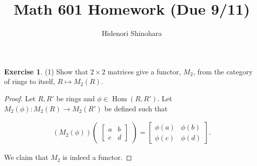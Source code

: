 \documentclass[12pt, psamsfonts]{amsart}
\theoremstyle{definition}
\newtheorem*{exer}{Exercise}
\theoremstyle{remark}
\DeclareMathOperator{\Hom}{Hom}
\numberwithin{equation}{section}
\begin{document}
\title{Math 601 Homework (Due 9/11)}
\author{Hidenori Shinohara}
\maketitle

\begin{exer}{(1)}
  Show that $2 \times 2$ matrices give a functor, $M_2$, from the category of rings to itself, $R \mapsto M_2(R)$.
\end{exer}

\begin{proof}
  Let $R, R'$ be rings and $\phi \in \Hom(R, R')$.
  Let $M_2(\phi): M_2(R) \rightarrow M_2(R')$ be defined such that

  \begin{align*}
    (M_2(\phi))\begin{pmatrix}\begin{bmatrix} a & b \\ c & d \end{bmatrix} \end{pmatrix} = 
    \begin{bmatrix} \phi(a) & \phi(b) \\ \phi(c) & \phi(d) \end{bmatrix}.
  \end{align*}

  We claim that $M_2$ is indeed a functor.


\end{proof}
\end{document}
